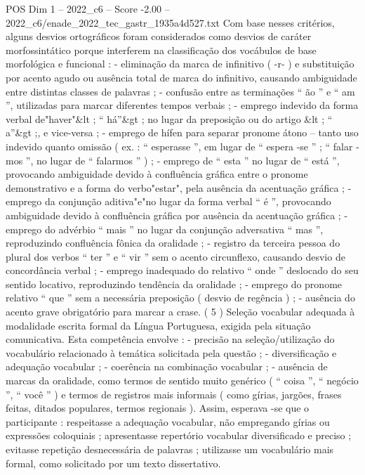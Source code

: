 \begin{textsample}{POS Dim 1 – 2022\_c6 – Score -2.00 – 2022\_c6/enade\_2022\_tec\_gastr\_1935a4d527.txt}
Com base nesses critérios, alguns desvios ortográficos foram considerados como desvios de caráter morfossintático porque interferem na classificação dos vocábulos de base morfológica e funcional : - eliminação da marca de infinitivo ( -r- ) e substituição por acento agudo ou ausência total de marca do infinitivo, causando ambiguidade entre distintas classes de palavras ; - confusão entre as terminações “ ão ” e “ am ”, utilizadas para marcar diferentes tempos verbais ; - emprego indevido da forma verbal de"haver"\&lt ; “ há”\&gt ; no lugar da preposição ou do artigo \&lt ; “ a”\&gt ;, e vice-versa ; - emprego de hífen para separar pronome átono – tanto uso indevido quanto omissão ( ex. : “ esperasse ”, em lugar de “ espera -se ” ; “ falar -mos ”, no lugar de “ falarmos ” ) ; - emprego de “ esta ” no lugar de “ está ”, provocando ambiguidade devido à confluência gráfica entre o pronome demonstrativo e a forma do verbo"estar", pela ausência da acentuação gráfica ; - emprego da conjunção aditiva"e"no lugar da forma verbal “ é ”, provocando ambiguidade devido à confluência gráfica por ausência da acentuação gráfica ; - emprego do advérbio “ mais ” no lugar da conjunção adversativa “ mas ”, reproduzindo confluência fônica da oralidade ; - registro da terceira pessoa do plural dos verbos “ ter ” e “ vir ” sem o acento circunflexo, causando desvio de concordância verbal ; - emprego inadequado do relativo “ onde ” deslocado do seu sentido locativo, reproduzindo tendência da oralidade ; - emprego do pronome relativo “ que ” sem a necessária preposição ( desvio de regência ) ; - ausência do acento grave obrigatório para marcar a crase. ( 5 ) Seleção vocabular adequada à modalidade escrita formal da Língua Portuguesa, exigida pela situação comunicativa.
Esta competência envolve : - precisão na seleção/utilização do vocabulário relacionado à temática solicitada pela questão ; - diversificação e adequação vocabular ; - coerência na combinação vocabular ; - ausência de marcas da oralidade, como termos de sentido muito genérico ( “ coisa ”, “ negócio ”, “ você ” ) e termos de registros mais informais ( como gírias, jargões, frases feitas, ditados populares, termos regionais ).
Assim, esperava -se que o participante : respeitasse a adequação vocabular, não empregando gírias ou expressões coloquiais ; apresentasse repertório vocabular diversificado e preciso ; evitasse repetição desnecessária de palavras ; utilizasse um vocabulário mais formal, como solicitado por um texto dissertativo.

\end{textsample}
